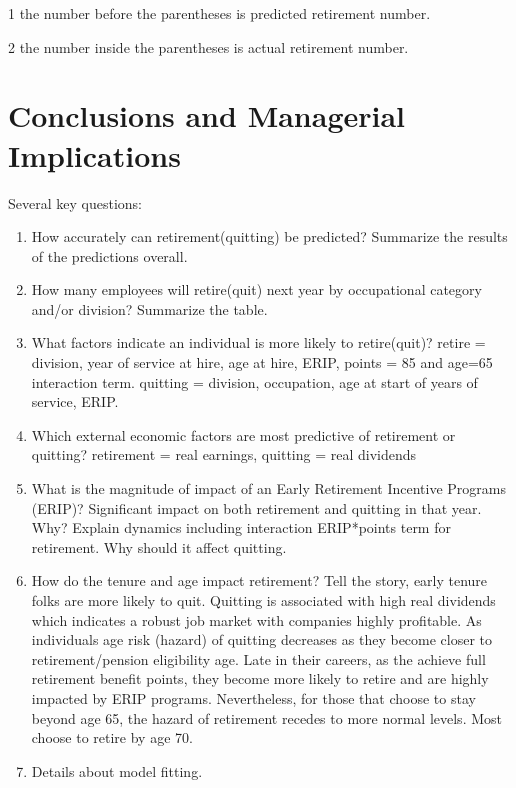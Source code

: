 \documentclass[12pt,letterpaper]{article}
\begin{document}
\begin{table}[h!]
\begin{threeparttable}
\begin{tabular}{cL{1.2cm}L{1.2cm}L{1.2cm}L{1.2cm}L{1.2cm}L{1.2cm}L{1.2cm}L{1.2cm}L{1.2cm}l}
			\bottomrule
		\end{tabular}%
		\begin{tablenotes}
			\item[1] the number before the parentheses is predicted retirement number.
			\item[2] the number inside the parentheses is actual retirement number.
		\end{tablenotes}
		
	\end{threeparttable}
	\label{tab:VQEIcocscode}
\end{table}


\section{Conclusions and Managerial Implications}

Several key questions:
\begin{enumerate}
	\item How accurately can retirement(quitting) be predicted?  Summarize the results of the predictions overall.
    \item How many employees will retire(quit) next year by occupational category and/or division?  Summarize the table.
	\item What factors indicate an individual is more likely to retire(quit)?  
retire = division, year of service at hire, age at hire, ERIP, points = 85 and age=65 interaction term.
quitting = division, occupation, age at start of years of service, ERIP.
	\item Which external economic factors are most predictive of retirement or quitting?
 retirement = real earnings, quitting = real dividends
	\item What is the magnitude  of impact of an Early Retirement Incentive Programs (ERIP)?  Significant impact on both retirement and quitting in that year.  Why?  Explain dynamics including interaction ERIP*points term for retirement.  Why should it affect quitting.
	\item How do the tenure and age impact retirement?  Tell the story, early tenure folks are more likely to quit.  Quitting is associated with high real dividends which indicates a robust job market with companies highly profitable.  As individuals age risk (hazard) of quitting decreases as they become closer to retirement/pension eligibility age. Late in their careers, as the achieve full retirement benefit points, they become more likely to retire and are highly impacted by ERIP programs.  Nevertheless, for those that choose to stay beyond age 65, the hazard of retirement recedes to more normal levels.  Most choose to retire by age 70.  

\item Details about model fitting.

\end{enumerate}
\end{document}
